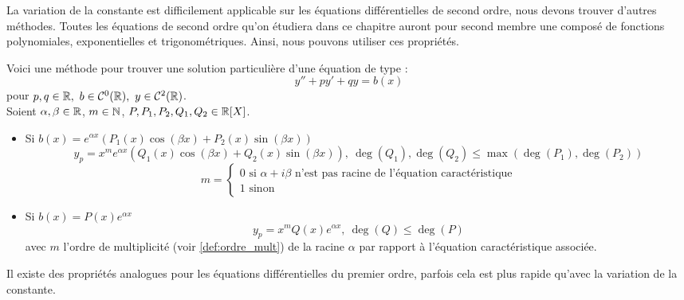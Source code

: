 \par La variation de la constante est difficilement applicable sur les équations différentielles de second ordre, nous devons trouver d'autres méthodes.
Toutes les équations de second ordre qu'on étudiera dans ce chapitre auront pour second membre une composé de fonctions polynomiales, exponentielles et trigonométriques. Ainsi, nous pouvons utiliser ces propriétés.
\\
\par \noindent Voici une méthode pour trouver une solution particulière d'une équation de type :
    \[ y'' + py' + qy = b(x) \]
    pour $p, q \in \R,\ b \in \mathcal{C}^0(\R),\ y \in \mathcal{C}^2(\R)$. \\
    Soient $\alpha, \beta \in \mathbb{R}$, $m \in \mathbb{N}$, $P, P_1, P_2, Q_1, Q_2 \in \mathbb{R}[X]$. 
    \begin{itemize}
        \item \cite{exo7_analyse1} Si $b(x) = e^{\alpha x}(P_1(x) \cos(\beta x) + P_2(x) \sin(\beta x) )$
        \[y_{p} = x^{m} e^{\alpha x}(Q_1(x) \cos(\beta x) + Q_2(x) \sin(\beta x)) ,\ \deg(Q_1), \deg(Q_2) \leq \max\left( \deg(P_1), \deg(P_2) \right) \]
        \[ m = \begin{cases}
            0 \text{ si } \alpha + i\beta \text{ n'est pas racine de l'équation caractéristique} \\
            1 \text{ sinon}
        \end{cases} \]
        \item Si $b(x) = P(x) e^{\alpha x}$ 
        \[ y_p = x^m Q(x)e^{\alpha x},\ \deg(Q) \leq \deg(P) \]
        avec $m$ l'ordre de multiplicité (voir \autoref{def:ordre_mult}) de la racine $\alpha$ par rapport à l'équation caractéristique associée.
\end{itemize}

\begin{remark}
    Il existe des propriétés analogues pour les équations différentielles du premier ordre, parfois cela est plus rapide qu'avec la variation de la constante.
\end{remark}

